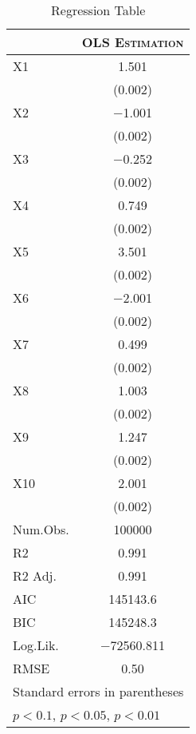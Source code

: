 \documentclass{article}
\begin{document}
\begin{table}[htbp]\centering
\centering
\caption{Regression Table}
\begin{tabular}[t]{lc}
\toprule
  &  \multicolumn{1}{c}{\textsc{OLS Estimation}}\\  
\hline \hline
\addlinespace
X1 & \num{1.501}\sym{***}\\
 & \vphantom{9} (\num{0.002})\\
X2 & \num{-1.001}\sym{***}\\
 & \vphantom{8} (\num{0.002})\\
X3 & \num{-0.252}\sym{***}\\
 & \vphantom{7} (\num{0.002})\\
X4 & \num{0.749}\sym{***}\\
 & \vphantom{6} (\num{0.002})\\
X5 & \num{3.501}\sym{***}\\
 & \vphantom{5} (\num{0.002})\\
X6 & \num{-2.001}\sym{***}\\
 & \vphantom{4} (\num{0.002})\\
X7 & \num{0.499}\sym{***}\\
 & \vphantom{3} (\num{0.002})\\
X8 & \num{1.003}\sym{***}\\
 & \vphantom{2} (\num{0.002})\\
X9 & \num{1.247}\sym{***}\\
 & \vphantom{1} (\num{0.002})\\
X10 & \num{2.001}\sym{***}\\
 & (\num{0.002})\\
\midrule
Num.Obs. & \num{100000}\\
R2 & \num{0.991}\\
R2 Adj. & \num{0.991}\\
AIC & \num{145143.6}\\
BIC & \num{145248.3}\\
Log.Lik. & \num{-72560.811}\\
RMSE & \num{0.50}\\
\bottomrule
\multicolumn{4}{l}{\footnotesize Standard errors in parentheses}\\
\multicolumn{4}{l}{\footnotesize \sym{*} \(p<0.1\), \sym{**} \(p<0.05\), \sym{***} \(p<0.01\)}\\
\end{tabular}
\end{table}
\end{document}
